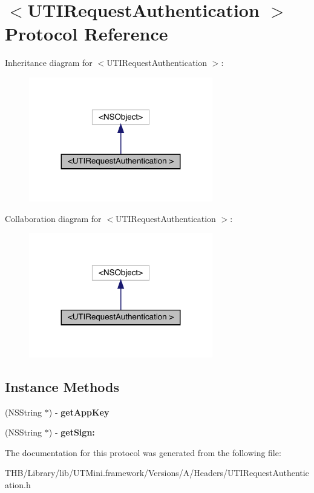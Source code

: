 \hypertarget{protocol_u_t_i_request_authentication_01-p}{}\section{$<$U\+T\+I\+Request\+Authentication $>$ Protocol Reference}
\label{protocol_u_t_i_request_authentication_01-p}


Inheritance diagram for $<$U\+T\+I\+Request\+Authentication $>$\+:\nopagebreak
\begin{figure}[H]
\begin{center}
\leavevmode
\includegraphics[width=227pt]{protocol_u_t_i_request_authentication_01-p__inherit__graph}
\end{center}
\end{figure}


Collaboration diagram for $<$U\+T\+I\+Request\+Authentication $>$\+:\nopagebreak
\begin{figure}[H]
\begin{center}
\leavevmode
\includegraphics[width=227pt]{protocol_u_t_i_request_authentication_01-p__coll__graph}
\end{center}
\end{figure}
\subsection*{Instance Methods}
\begin{DoxyCompactItemize}
\item 
\mbox{\label{protocol_u_t_i_request_authentication_01-p_a4fc385e7da7679265c8edd6dd0ba418c}} 
(N\+S\+String $\ast$) -\/ {\bfseries get\+App\+Key}
\item 
\mbox{\label{protocol_u_t_i_request_authentication_01-p_ae38672c6063036cd75d45212c0575775}} 
(N\+S\+String $\ast$) -\/ {\bfseries get\+Sign\+:}
\end{DoxyCompactItemize}


The documentation for this protocol was generated from the following file\+:\begin{DoxyCompactItemize}
\item 
T\+H\+B/\+Library/lib/\+U\+T\+Mini.\+framework/\+Versions/\+A/\+Headers/U\+T\+I\+Request\+Authentication.\+h\end{DoxyCompactItemize}

